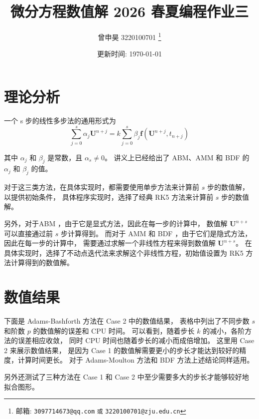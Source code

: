 \documentclass[a4paper]{article}
\begin{document}
\title{微分方程数值解 2026 春夏编程作业三}

\author{曾申昊 3220100701
  \thanks{邮箱: \texttt{3097714673@qq.com}
                            \texttt{或} \texttt{3220100701@zju.edu.cn}}}

\date{更新时间: \today}

\maketitle


\section{理论分析}

\par  一个 s 步的线性多步法的通用形式为
\begin{equation}
  \sum_{j=0}^s \alpha_j \mathbf{U}^{n+j} 
  = k \sum_{j=0}^s \beta_j \mathbf{f}(\mathbf{U}^{n+j}, t_{n+j})
\end{equation}
\par 其中 $\alpha_j$ 和 $\beta_j$ 是常数，且 $\alpha_s \neq 0$。
讲义上已经给出了 ABM、AMM 和 BDF 的 $\alpha_j$ 和 $\beta_j$ 的值。
\par 对于这三类方法，在具体实现时，都需要使用单步方法来计算前 $s$ 步的数值解，以提供初始条件，
具体程序实现时，选择了经典 RK5 方法来计算前 $s$ 步的数值解。
\par 另外，对于ABM ，由于它是显式方法，因此在每一步的计算中，
数值解 $\mathbf{U}^{n+s}$ 可以直接通过前 $s$ 步计算得到。
而对于 AMM 和 BDF ，由于它们是隐式方法，因此在每一步的计算中，
需要通过求解一个非线性方程来得到数值解 $\mathbf{U}^{n+s}$。
在具体实现时，选择了不动点迭代法来求解这个非线性方程，初始值设置为 RK5 方法计算得到的数值解。

\section{数值结果}


\par 下面是 Adams-Bashforth 方法在 Case 2 中的数值结果，
表格中列出了不同步数 $s$ 和阶数 $p$ 的数值解的误差和 CPU 时间。
可以看到，随着步长 $k$ 的减小，各阶方法的误差相应收敛，
同时 CPU 时间也随着步长的减小而成倍增加。
这里用 Case 2 来展示数值结果，
是因为 Case 1 的数值解需要更小的步长才能达到较好的精度，计算时间更长。
对于 Adams-Moulton 方法和 BDF 方法上述结论同样适用。
\par 另外还测试了三种方法在 Case 1 和 Case 2
中至少需要多大的步长才能够较好地拟合图形。 
\end{document}
